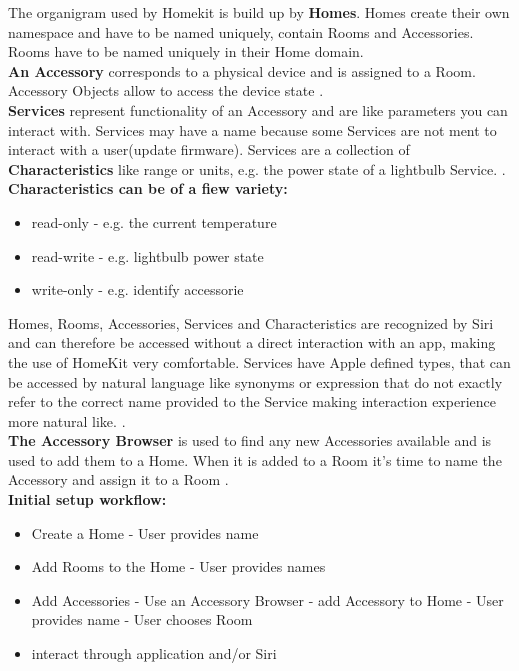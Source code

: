 			The organigram used by Homekit is build up by \textbf{Homes}. Homes create their own namespace and have to be named uniquely, contain Rooms and Accessories. Rooms have to be named uniquely in their Home domain. \parencite{IntroToHomeKit}\\

			\textbf{An Accessory} corresponds to a physical device and is assigned to a Room. Accessory Objects allow to access the device state \parencite{IntroToHomeKit}.\\

			\textbf{Services} represent functionality of an Accessory and are like parameters you can interact with. Services may have a name because some Services are not ment to interact with a user(update firmware). Services are a collection of \textbf{Characteristics} like range or units, e.g. the power state of a lightbulb Service. \parencite{IntroToHomeKit}.\\

			\textbf{Characteristics can be of a fiew variety:}

			\begin{itemize}
				\item read-only  - e.g. the current temperature 
				\item read-write - e.g. lightbulb power state
				\item write-only - e.g. identify accessorie
			\end{itemize}


			Homes, Rooms, Accessories, Services and Characteristics are recognized by Siri and can therefore be accessed without a direct interaction with an app, making the use of HomeKit very comfortable. Services have Apple defined types, that can be accessed by natural language like synonyms or expression that do not exactly refer to the correct name provided to the Service making interaction experience more natural like. \parencite{IntroToHomeKit}.\\

			\textbf{The Accessory Browser} is used to find any new Accessories available and is used to add them to a Home. When it is added to a Room it's time to name the Accessory and assign it to a Room \parencite{IntroToHomeKit}.\\

			\textbf{Initial setup workflow:} 

			\begin{itemize}
				\item Create a Home - User provides name
				\item Add Rooms to the Home - User provides names
				\item Add Accessories - Use an Accessory Browser - add Accessory to Home - User provides name - User chooses Room
				\item interact through application and/or Siri
			\end{itemize}

